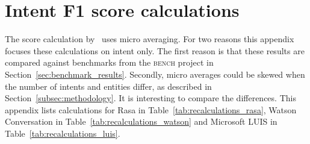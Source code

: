 \chapter{Intent F1 score calculations}
\label{ch:intent_f1_score_calculations}

The \fone score calculation by~\citep{braun2017} uses micro averaging.
For two reasons this appendix focuses these calculations on intent only.
The first reason is that these results are compared against benchmarks from the \textsc{bench} project in Section~\ref{sec:benchmark_results}.
Secondly, micro averages could be skewed when the number of intents and entities differ, as described in Section~\ref{subsec:methodology}.
It is interesting to compare the differences.
This appendix lists calculations for Rasa in Table~\ref{tab:recalculations_rasa}, Watson Conversation in Table~\ref{tab:recalculations_watson} and Microsoft LUIS in Table~\ref{tab:recalculations_luis}.

